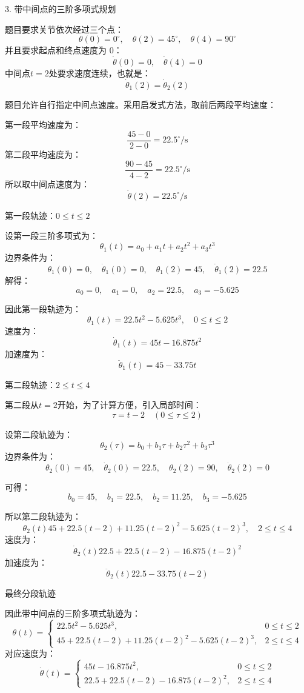 {3. 带中间点的三阶多项式规划

题目要求关节依次经过三个点：
$$
\theta(0)=0^\circ,\quad \theta(2)=45^\circ,\quad \theta(4)=90^\circ
$$
并且要求起点和终点速度为 0：
$$
\dot{\theta}(0)=0,\quad \dot{\theta}(4)=0
$$
中间点$t=2$处要求速度连续，也就是：
$$
\dot{\theta}_1(2)=\dot{\theta}_2(2)
$$

题目允许自行指定中间点速度。采用启发式方法，取前后两段平均速度：

第一段平均速度为：
$$
\frac{45-0}{2-0}=22.5^\circ/\mathrm{s}
$$
第二段平均速度为：
$$
\frac{90-45}{4-2}=22.5^\circ/\mathrm{s}
$$
所以取中间点速度为：
$$
\dot{\theta}(2)=22.5^\circ/\mathrm{s}
$$

第一段轨迹：$0\leq t\leq 2$

设第一段三阶多项式为：
$$
\theta_1(t)=a_0+a_1t+a_2t^2+a_3t^3
$$
边界条件为：
$$
\theta_1(0)=0,\quad \dot{\theta}_1(0)=0,\quad \theta_1(2)=45,\quad \dot{\theta}_1(2)=22.5
$$
解得：
$$
a_0=0,\quad a_1=0,\quad a_2=22.5,\quad a_3=-5.625
$$

因此第一段轨迹为：
$$
\theta_1(t)=22.5t^2-5.625t^3,\quad 0\leq t\leq 2
$$
速度为：
$$
\dot{\theta}_1(t)=45t-16.875t^2
$$
加速度为：
$$
\ddot{\theta}_1(t)=45-33.75t
$$

第二段轨迹：$2\leq t\leq 4$

第二段从$t=2$开始，为了计算方便，引入局部时间：
$$
\tau=t-2 \quad (0\leq \tau\leq 2)
$$

设第二段轨迹为：
$$
\theta_2(\tau)=b_0+b_1\tau+b_2\tau^2+b_3\tau^3
$$
边界条件为：
$$
\theta_2(0)=45,\quad \dot{\theta}_2(0)=22.5,\quad \theta_2(2)=90,\quad \dot{\theta}_2(2)=0
$$

可得：
$$
b_0=45,\quad b_1=22.5,\quad b_2=11.25,\quad b_3=-5.625
$$

所以第二段轨迹为：
$$
\theta_2(t)
45+22.5(t-2)+11.25(t-2)^2-5.625(t-2)^3,
\quad 2\leq t\leq 4
$$
速度为：
$$
\dot{\theta}_2(t)
22.5+22.5(t-2)-16.875(t-2)^2
$$
加速度为：
$$
\ddot{\theta}_2(t)
22.5-33.75(t-2)
$$

最终分段轨迹

因此带中间点的三阶多项式轨迹为：
$$
\theta(t)=
\begin{cases}
22.5t^2-5.625t^3, & 0\leq t\leq 2\\
45+22.5(t-2)+11.25(t-2)^2-5.625(t-2)^3, & 2\leq t\leq 4
\end{cases}
$$
对应速度为：
$$
\dot{\theta}(t)=
\begin{cases}
45t-16.875t^2, & 0\leq t\leq 2\\
22.5+22.5(t-2)-16.875(t-2)^2, & 2\leq t\leq 4
\end{cases}
$$

}
